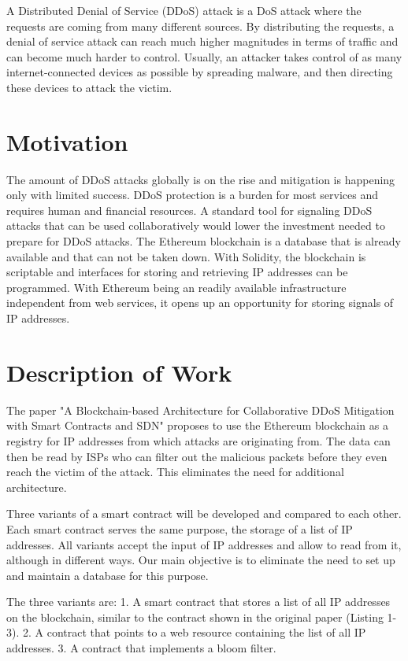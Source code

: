 A Distributed Denial of Service (DDoS) attack is a DoS attack where the requests are coming from many different sources. By distributing the requests, a denial of service attack can reach much higher magnitudes in terms of traffic and can become much harder to control.
Usually, an attacker takes control of as many internet-connected devices as possible by spreading malware, and then directing these devices to attack the victim.


\section{Motivation}

The amount of DDoS attacks globally is on the rise \cite{DDoSRise} and mitigation is happening only with limited success. 
DDoS protection is a burden for most services and requires human and financial resources. A standard tool for signaling DDoS attacks that can be used collaboratively would lower the investment needed to prepare for DDoS attacks.
The Ethereum blockchain is a database that is already available and that can not be taken down. With Solidity, the blockchain is scriptable and interfaces for storing and retrieving IP addresses can be programmed. With Ethereum being an readily available infrastructure independent from web services, it opens up an opportunity for storing signals of IP addresses.

\section{Description of Work}

The paper {"}A Blockchain-based Architecture for Collaborative DDoS Mitigation with Smart Contracts and SDN{"} \cite{OriginalPaper} proposes to use the Ethereum blockchain as a registry for IP addresses from which attacks are originating from. The data can then be read by ISPs who can filter out the malicious packets before they even reach the victim of the attack. This eliminates the need for additional architecture.

Three variants of a smart contract will be developed and compared to each other. Each smart contract serves the same purpose, the storage of a list of IP addresses. All variants accept the input of IP addresses and allow to read from it, although in different ways.
Our main objective is to eliminate the need to set up and maintain a database for this purpose.

The three variants are: 1. A smart contract that stores a list of all IP addresses on the blockchain, similar to the contract shown in the original paper \cite{OriginalPaper} (Listing 1-3). 2. A contract that points to a web resource containing the list of all IP addresses. 3. A contract that implements a bloom filter.

